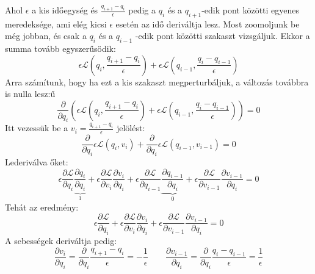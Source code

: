 \documentclass[../main.tex]{subfiles}
\begin{document}
Ahol $\epsilon$ a kis időegység és $\frac{q_{i+1} - q_i}{\epsilon}$ pedig a $q_i$ és a $q_{i+1}$-edik pont közötti egyenes meredeksége, ami elég kicsi $\epsilon$ esetén az idő deriváltja lesz. Most zoomoljunk be még jobban, és csak a $q_i$ és a $q_{i-1}$ -edik pont közötti szakaszt vizsgáljuk. Ekkor a summa tovább egyszerűsödik:
\begin{equation}
    \epsilon \mathcal{L}\left(q_i, \frac{q_{i+1} - q_i}{\epsilon}\right) + \epsilon \mathcal{L}\left(q_{i-1}, \frac{q_{i} - q_{i-1}}{\epsilon}\right)
\end{equation}
Arra számítunk, hogy ha ezt a kis szakaszt megperturbáljuk, a változás továbbra is nulla lesz:ű
\begin{equation}
    \frac{\partial}{\partial q_i} \left( \epsilon \mathcal{L}\left(q_i, \frac{q_{i+1} - q_i}{\epsilon}\right) + \epsilon \mathcal{L}\left(q_{i-1}, \frac{q_{i} - q_{i-1}}{\epsilon}\right)\right) = 0
\end{equation}
Itt vezessük be a $v_i = \frac{q_{i+1} - q_i}{\epsilon}$ jelölést:
\begin{equation}
    \frac{\partial}{\partial q_i} \epsilon \mathcal{L}\left(q_i, v_i\right) + \frac{\partial}{\partial q_i} \epsilon \mathcal{L}\left(q_{i-1}, v_{i-1}\right) = 0
\end{equation}
Lederiválva őket:
\begin{equation}
    \epsilon \frac{\partial \mathcal{L}}{\partial q_i} \underbrace{\frac{\partial q_i}{\partial q_i}}_{1} + \epsilon \frac{\partial \mathcal{L}}{\partial v_i} \frac{\partial v_i}{\partial q_i} + \epsilon \frac{\partial \mathcal{L}}{\partial q_{i-1}} \underbrace{\frac{\partial q_{i-1}}{\partial q_i}}_0 + \epsilon \frac{\partial \mathcal{L}}{\partial v_{i-1}} \frac{\partial v_{i-1}}{\partial q_i} = 0
\end{equation}
Tehát az eredmény:
\begin{equation}
    \epsilon \frac{\partial \mathcal{L}}{\partial q_i} + \epsilon \frac{\partial \mathcal{L}}{\partial v_i} \frac{\partial v_i}{\partial q_i} + \epsilon \frac{\partial \mathcal{L}}{\partial v_{i-1}} \frac{\partial v_{i-1}}{\partial q_i} = 0
\end{equation}
A sebességek deriváltja pedig:
\begin{equation}
    \frac{\partial v_i}{\partial q_i} = \frac{\partial}{\partial q_i} \frac{q_{i+1} - q_i}{\epsilon} = - \frac{1}{\epsilon} \qquad \frac{\partial v_{i-1}}{\partial q_i} = \frac{\partial}{\partial q_i} \frac{q_{i} - q_{i-1}}{\epsilon} = \frac{1}{\epsilon}
\end{equation}
\end{document}
